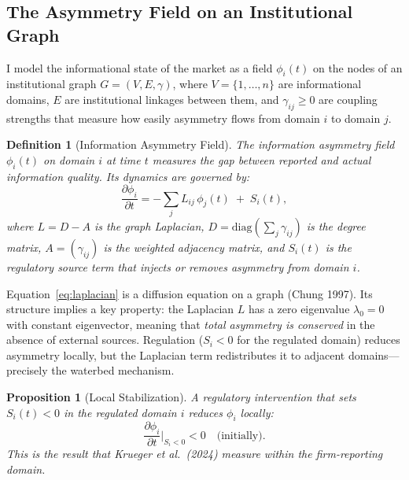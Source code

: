 \documentclass[12pt,a4paper]{article}
\newtheorem{proposition}{Proposition}
\newtheorem{definition}{Definition}
\begin{document}
\subsection{The Asymmetry Field on an Institutional Graph}

I model the informational state of the market as a field $\phi_i(t)$ on the nodes of an institutional graph $G = (V, E, \gamma)$, where $V = \{1, \ldots, n\}$ are informational domains, $E$ are institutional linkages between them, and $\gamma_{ij} \geq 0$ are coupling strengths that measure how easily asymmetry flows from domain $i$ to domain $j$.

\begin{definition}[Information Asymmetry Field]
\label{def:field}
The information asymmetry field $\phi_i(t)$ on domain $i$ at time $t$ measures the gap between reported and actual information quality. Its dynamics are governed by:
\begin{equation}
\frac{\partial \phi_i}{\partial t} = -\sum_{j} L_{ij}\, \phi_j(t) \;+\; S_i(t),
\label{eq:laplacian}
\end{equation}
where $L = D - A$ is the graph Laplacian, $D = \mathrm{diag}(\sum_j \gamma_{ij})$ is the degree matrix, $A = (\gamma_{ij})$ is the weighted adjacency matrix, and $S_i(t)$ is the regulatory source term that injects or removes asymmetry from domain $i$.
\end{definition}

Equation~\eqref{eq:laplacian} is a diffusion equation on a graph (Chung 1997). Its structure implies a key property: the Laplacian $L$ has a zero eigenvalue $\lambda_0 = 0$ with constant eigenvector, meaning that \textit{total asymmetry is conserved} in the absence of external sources. Regulation ($S_i < 0$ for the regulated domain) reduces asymmetry locally, but the Laplacian term redistributes it to adjacent domains---precisely the waterbed mechanism.

\begin{proposition}[Local Stabilization]
\label{prop:local}
A regulatory intervention that sets $S_i(t) < 0$ in the regulated domain $i$ reduces $\phi_i$ locally:
\begin{equation}
\frac{\partial \phi_i}{\partial t}\bigg|_{S_i < 0} < 0 \quad \text{(initially)}.
\end{equation}
This is the result that Krueger et al.\ (2024) measure within the firm-reporting domain.
\end{proposition}
\end{document}
